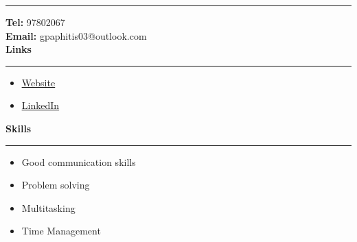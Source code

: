 \documentclass[12pt]{article}
\begin{document}
\begin{paracol}{2}
\begin{tcolorbox}[colback=bgcolor, colframe=bgcolor, boxrule=0cm, arc=0cm, outer arc=0cm, left=0.35cm, right=0.10cm, top=1cm, bottom=1.5cm,height=\textheight]
      \hrule
      \vspace{0.2cm}
      {\fontsize{10pt}{18pt}\selectfont
         \textbf{Tel:} 97802067\\
         \textbf{Email:} gpaphitis03@outlook.com\\
      }
      \vspace{0.5cm}
      {\fontsize{12pt}{18pt}\selectfont
         \textbf{{\large Links}}\\
         }
      \vspace{0.15cm}
      \hrule
      \vspace{0.2cm}
      {\fontsize{10pt}{13pt}\selectfont
      {\hypersetup{linkcolor=white, urlcolor=white, citecolor=white}
         \begin{itemize}[leftmargin=15pt, itemsep=0pt, topsep=0pt]
            \item\underline{\href{https://giorgospaphitis.com}{Website}}\\
            \item\underline{\href{https://www.linkedin.com/in/giorgos-paphitis-7307a825b/}{LinkedIn}}\\
         \end{itemize}
      }
      }
      \vspace{0.5cm}
      {\fontsize{12pt}{18pt}\selectfont
         \textbf{{\large Skills}}\\
         }
      \vspace{0.15cm}
      \hrule
      \vspace{0.2cm}
      {\fontsize{10pt}{13pt}\selectfont
      \begin{itemize}[leftmargin=15pt, itemsep=0pt, topsep=0pt]
         \item Good communication skills\\
         \item Problem solving\\
         \item Multitasking\\
         \item Time Management\\

\end{itemize}}
\end{tcolorbox}
\end{paracol}
\end{document}
